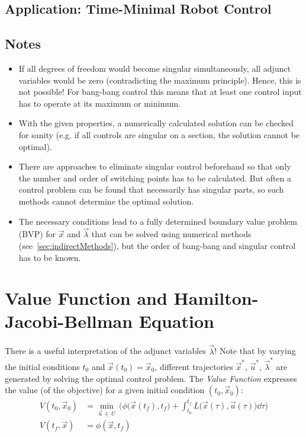 		\subsection{Application: Time-Minimal Robot Control} %

		\subsection{Notes}
			\begin{itemize}
				\item If all degrees of freedom would become singular simultaneously, all adjunct variables would be zero (contradicting the maximum principle). Hence, this is not possible! For bang-bang control this means that at least one control input has to operate at its maximum or minimum.
				\item With the given properties, a numerically calculated solution can be checked for sanity (e.g. if all controls are singular on a section, the solution cannot be optimal).
				\item There are approaches to eliminate singular control beforehand so that only the number and order of switching points has to be calculated. But often a control problem can be found that necessarily has singular parts, so such methods cannot determine the optimal solution.
				\item The necessary conditions lead to a fully determined boundary value problem (BVP) for \(\vec{x}\) and \(\vec{\lambda}\) that can be solved using numerical methods (see~\autoref{sec:indirectMethods}), but the order of bang-bang and singular control has to be known.
			\end{itemize}

	\section{Value Function and Hamilton-Jacobi-Bellman Equation}
		There is a useful interpretation of the adjunct variables \(\vec{\lambda}\)! Note that by varying the initial conditions \(t_0\) and \( \vec{x}(t_0) = \vec{x}_0 \), different trajectories \(\vec{x}^\ast\), \(\vec{u}^\ast\), \(\vec{\lambda}^\ast\) are generated by solving the optimal control problem. The \emph{Value Function} expresses the value (of the objective) for a given initial condition \( (t_0, \vec{x}_0) \):
		\begin{align*}
			V(t_0, \vec{x}_0) & = \min_{\vec{u} \,\in\, U} \, \Bigg(\! \phi\big(\vec{x}(t_f), t_f\big) + \int_{t_0}^{t_f}\! L\big(\vec{x}(\tau), \vec{u}(\tau)\big) \dd{\tau} \!\Bigg) \\
			V(t_f, \vec{x})   & = \phi(\vec{x}, t_f)
		\end{align*}

